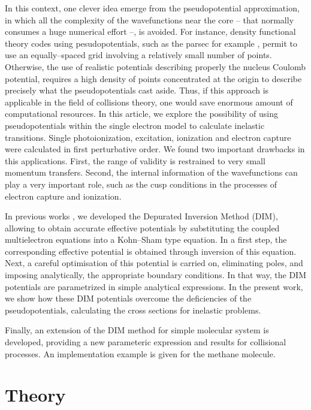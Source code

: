 \documentclass[10pt]{article}
\begin{document}
In this context, one clever idea emerge from the pseudopotential
approximation, 
in which all the complexity of the wavefunctions near the core  
-- that normally consumes a huge numerical effort --, is avoided.
For instance, density functional theory codes using pesudopotentials, 
such as the {\sc parsec} for example \cite{parsecwebpage,Chelikowsky1994}, 
permit to use an 
equally--spaced grid involving a relatively small number of points. 
Otherwise, the use of realistic potentials describing properly the
nucleus Coulomb potential, requires a high density of points 
concentrated at the origin to describe precisely what the 
pseudopotentials cast aside. 
Thus, if this approach is applicable in the field of collisions theory, 
one would save enormous amount of computational resources.
In this article, we explore the possibility of using pseudopotentials 
within the single electron model to calculate inelastic transitions. 
Single photoionization, excitation, ionization and electron capture were
calculated in first perturbative order. 
We found two important drawbacks in this applications. 
First, the range of validity is restrained to very
small momentum transfers.
Second, the internal information of the wavefunctions can play a very 
important role, such as the cusp conditions in the processes of 
electron capture and ionization. 

In previous works \cite{Mendez2015,Mendez2016,Mendez2018}, we developed the 
Depurated Inversion Method 
(DIM), allowing to obtain accurate effective potentials by substituting 
the coupled multielectron equations into a Kohn--Sham type equation. 
In a first step, the corresponding effective potential is obtained 
through inversion of this equation. 
Next, a careful optimisation of this potential is carried on, eliminating 
poles, and imposing analytically, the appropriate boundary conditions. 
In that way, the DIM potentials are parametrized in simple analytical 
expressions.
In the present work, we show how these DIM potentials overcome the 
deficiencies of the pseudopotentials, calculating the cross sections 
for inelastic problems.

Finally, an extension of the DIM method for simple molecular system 
is developed, providing a new parameteric expression and results for 
collisional processes. An implementation example is given for the 
methane molecule.


\section{Theory}
\end{document}
